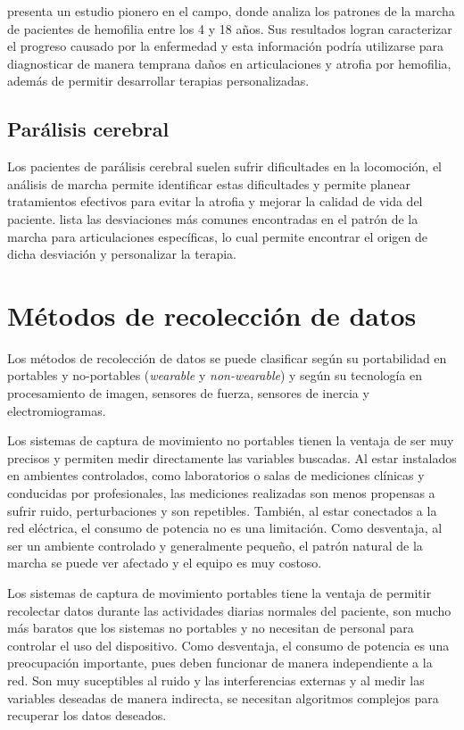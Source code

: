 \cite{forneris} presenta un estudio pionero en el campo, donde analiza los patrones de la marcha de pacientes de hemofilia entre los 4 y 18 años. Sus resultados logran caracterizar el progreso causado por la enfermedad y esta información podría utilizarse para diagnosticar de manera temprana daños en articulaciones y atrofia por hemofilia, además de permitir desarrollar terapias personalizadas. 

\subsection{Parálisis cerebral}

Los pacientes de parálisis cerebral suelen sufrir dificultades en la locomoción, el análisis de marcha permite identificar estas dificultades y permite planear tratamientos efectivos para evitar la atrofia y mejorar la calidad de vida del paciente. \cite{sangeux} lista las desviaciones más comunes encontradas en el patrón de la marcha para articulaciones específicas, lo cual permite encontrar el origen de dicha desviación y personalizar la terapia.


\section[Métodos de recolección]{Métodos de recolección de datos}

Los métodos de recolección de datos se puede clasificar según su portabilidad en portables y no-portables (\emph{wearable} y \emph{non-wearable}) y según su tecnología en procesamiento de imagen, sensores de fuerza, sensores de inercia y electromiogramas. \citep{muro}

Los sistemas de captura de movimiento no portables tienen la ventaja de ser muy precisos y permiten medir directamente las variables buscadas. Al estar instalados en ambientes controlados, como laboratorios o salas de mediciones clínicas y conducidas por profesionales, las mediciones realizadas son menos propensas a sufrir ruido, perturbaciones y son repetibles. También, al estar conectados a la red eléctrica, el consumo de potencia no es una limitación. Como desventaja, al ser un ambiente controlado y generalmente pequeño, el patrón natural de la marcha se puede ver afectado y el equipo es muy costoso. \citep{muro}

Los sistemas de captura de movimiento portables tiene la ventaja de permitir recolectar datos durante las actividades diarias normales del paciente, son mucho más baratos que los sistemas no portables y no necesitan de personal para controlar el uso del dispositivo. Como desventaja, el consumo de potencia es una preocupación importante, pues deben funcionar de manera independiente a la red. Son muy suceptibles al ruido y las interferencias externas y al medir las variables deseadas de manera indirecta, se necesitan algoritmos complejos para recuperar los datos deseados. \citep{muro}

